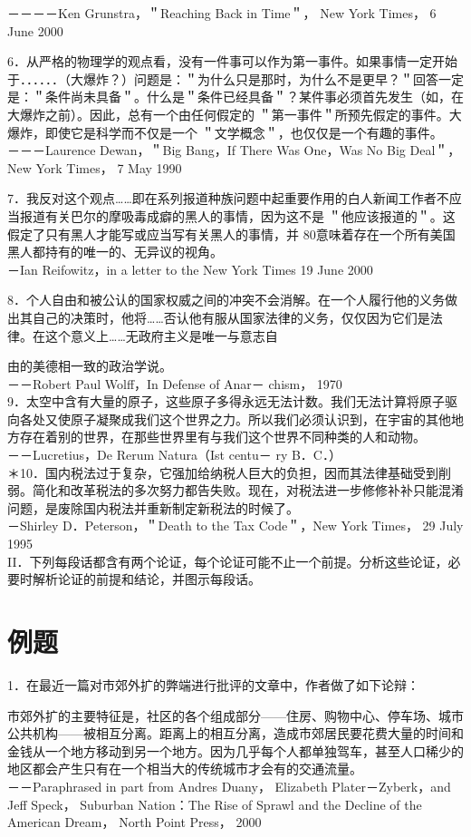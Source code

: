 －－－－Ken Grunstra，＂Reaching Back in Time＂， New York Times， 6 June 2000

6．从严格的物理学的观点看，没有一件事可以作为第一事件。如果事情一定开始于．．．．．．（大爆炸？）问题是：＂为什么只是那时，为什么不是更早？＂回答一定是：＂条件尚未具备＂。什么是＂条件已经具备＂？某件事必须首先发生（如，在大爆炸之前）。因此，总有一个由任何假定的 ＂第一事件＂所预先假定的事件。大爆炸，即使它是科学而不仅是一个 ＂文学概念＂，也仅仅是一个有趣的事件。\\
－－－Laurence Dewan，＂Big Bang，If There Was One，Was No Big Deal＂，New York Times， 7 May 1990

7．我反对这个观点……即在系列报道种族问题中起重要作用的白人新闻工作者不应当报道有关巴尔的摩吸毒成癖的黑人的事情，因为这不是 ＂他应该报道的＂。这假定了只有黑人才能写或应当写有关黑人的事情，并 80意味着存在一个所有美国黑人都持有的唯一的、无异议的视角。\\
－Ian Reifowitz，in a letter to the New York Times 19 June 2000

8．个人自由和被公认的国家权威之间的冲突不会消解。在一个人履行他的义务做出其自己的决策时，他将……否认他有服从国家法律的义务，仅仅因为它们是法律。在这个意义上……无政府主义是唯一与意志自

由的美德相一致的政治学说。\\
－－Robert Paul Wolff，In Defense of Anar－ chism， 1970\\
9．太空中含有大量的原子，这些原子多得永远无法计数。我们无法计算将原子驱向各处又使原子凝聚成我们这个世界之力。所以我们必须认识到，在宇宙的其他地方存在着别的世界，在那些世界里有与我们这个世界不同种类的人和动物。\\
－－Lucretius，De Rerum Natura（Ist centu－ ry B．C．）\\
＊10．国内税法过于复杂，它强加给纳税人巨大的负担，因而其法律基础受到削弱。简化和改革税法的多次努力都告失败。现在，对税法进一步修修补补只能混淆问题，是废除国内税法并重新制定新税法的时候了。\\
－Shirley D．Peterson，＂Death to the Tax Code＂，New York Times， 29 July 1995\\
II．下列每段话都含有两个论证，每个论证可能不止一个前提。分析这些论证，必要时解析论证的前提和结论，并图示每段话。

\section*{例题}
1．在最近一篇对市郊外扩的弊端进行批评的文章中，作者做了如下论辩：

市郊外扩的主要特征是，社区的各个组成部分——住房、购物中心、停车场、城市公共机构——被相互分离。距离上的相互分离，造成市郊居民要花费大量的时间和金钱从一个地方移动到另一个地方。因为几乎每个人都单独驾车，甚至人口稀少的地区都会产生只有在一个相当大的传统城市才会有的交通流量。\\
－－Paraphrased in part from Andres Duany， Elizabeth Plater－Zyberk，and Jeff Speck， Suburban Nation：The Rise of Sprawl and the Decline of the American Dream， North Point Press， 2000

